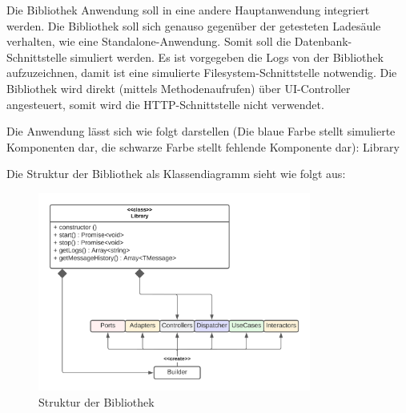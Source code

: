 Die Bibliothek Anwendung soll in eine andere Hauptanwendung integriert werden. 
Die Bibliothek soll sich genauso gegenüber der getesteten Ladesäule verhalten, wie eine Standalone-Anwendung. 
Somit soll die Datenbank-Schnittstelle simuliert werden. 
Es ist vorgegeben die Logs von der Bibliothek aufzuzeichnen, damit ist eine simulierte Filesystem-Schnittstelle notwendig.
Die Bibliothek wird direkt (mittels Methodenaufrufen) über UI-Controller angesteuert, 
somit wird die HTTP-Schnittstelle nicht verwendet. 

Die Anwendung lässt sich wie folgt darstellen (Die blaue Farbe stellt simulierte Komponenten
dar, die schwarze Farbe stellt fehlende Komponente dar):
{Library}

\newpage
Die Struktur der Bibliothek als Klassendiagramm sieht wie folgt aus:

\begin{figure}[H]
    \centering
    \includegraphics[width=0.8\textwidth]{./images/LibraryKlassenDiagramm.png}
    \caption[Struktur der Bibliothek]{Struktur der Bibliothek}
    \label{fig:LibraryClassDiagramm}
\end{figure}